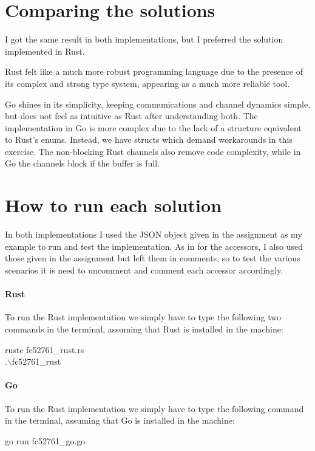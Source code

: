 \documentclass[a4paper]{article}
\begin{document}
\section*{Comparing the solutions}
I got the same result in both implementations, but I preferred the solution implemented in Rust.

Rust felt like a much more robust programming language due to the presence of its complex and strong type system, appearing as a much more reliable tool.

Go shines in its simplicity, keeping communications and channel dynamics simple, but does not feel as intuitive as Rust after understanding both.
The implementation in Go is more complex due to the lack of a structure equivalent to Rust's enums. Instead, we have structs which demand workarounds in this exercise. The non-blocking Rust channels also remove code complexity, while in Go the channels block if the buffer is full.

\section*{How to run each solution}
In both implementations I used the JSON object given in the assignment as my example to run and test the implementation. As in for the accessors, I also used those given in the assignment but left them in comments, so to test the various scenarios it is need to uncomment and comment each accessor accordingly.
\paragraph*{Rust}
To run the Rust implementation we simply have to type the following two commands in the terminal, assuming that Rust is installed in the machine:

\begin{center}
  rustc fc52761\_rust.rs\\
  .$\backslash$fc52761\_rust
\end{center}

\paragraph*{Go}
To run the Rust implementation we simply have to type the following command in the terminal, assuming that Go is installed in the machine:

\begin{center}
  go run fc52761\_go.go
\end{center}
\end{document}

